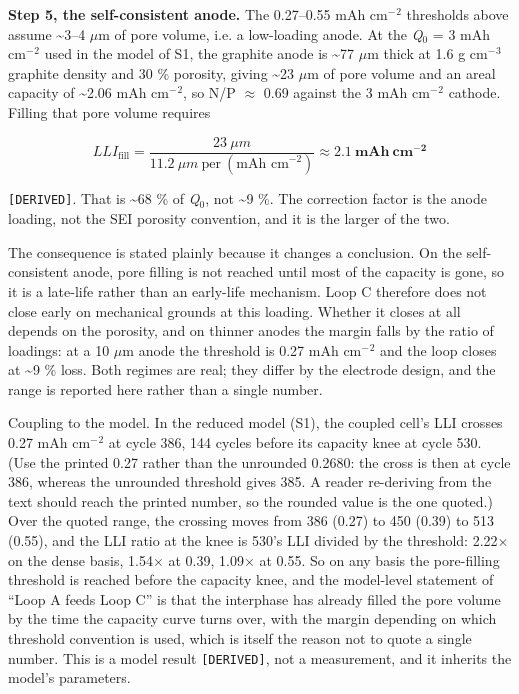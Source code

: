 \documentclass[11pt,a4paper]{article}
\begin{document}
\textbf{Step 5, the self-consistent anode.} The 0.27--0.55 mAh cm\ensuremath{^{-}}\ensuremath{^{2}} thresholds above assume \textasciitilde{}3--4 \ensuremath{\mu}m of pore volume, i.e. a low-loading anode. At the \emph{Q}\ensuremath{_{0}} = 3 mAh cm\ensuremath{^{-}}\ensuremath{^{2}} used in the model of S1, the graphite anode is \textasciitilde{}77 \ensuremath{\mu}m thick at 1.6 g cm\ensuremath{^{-}}\ensuremath{^{3}} graphite density and 30 \% porosity, giving \textasciitilde{}23 \ensuremath{\mu}m of pore volume and an areal capacity of \textasciitilde{}2.06 mAh cm\ensuremath{^{-}}\ensuremath{^{2}}, so N/P \ensuremath{\approx} 0.69 against the 3 mAh cm\ensuremath{^{-}}\ensuremath{^{2}} cathode. Filling that pore volume requires


\begin{equation}LLI_{\text{fill}} = \frac{23\ \mu m}{11.2\ \mu m\ \text{per}\ (\text{mAh cm}^{-2})} \approx \mathbf{2.1\ mAh\ cm^{-2}} \tag{S2.11}\end{equation}


\texttt{[DERIVED]}. That is \textasciitilde{}68 \% of \emph{Q}\ensuremath{_{0}}, not \textasciitilde{}9 \%. The correction factor is the anode loading, not the SEI porosity convention, and it is the larger of the two.


The consequence is stated plainly because it changes a conclusion. On the self-consistent anode, pore filling is not reached until most of the capacity is gone, so it is a late-life rather than an early-life mechanism. Loop C therefore does not close early on mechanical grounds at this loading. Whether it closes at all depends on the porosity, and on thinner anodes the margin falls by the ratio of loadings: at a 10 \ensuremath{\mu}m anode the threshold is 0.27 mAh cm\ensuremath{^{-}}\ensuremath{^{2}} and the loop closes at \textasciitilde{}9 \% loss. Both regimes are real; they differ by the electrode design, and the range is reported here rather than a single number.


Coupling to the model. In the reduced model (S1), the coupled cell's LLI crosses 0.27 mAh cm\ensuremath{^{-}}\ensuremath{^{2}} at cycle 386, 144 cycles before its capacity knee at cycle 530. (Use the printed 0.27 rather than the unrounded 0.2680: the cross is then at cycle 386, whereas the unrounded threshold gives 385. A reader re-deriving from the text should reach the printed number, so the rounded value is the one quoted.) Over the quoted range, the crossing moves from 386 (0.27) to 450 (0.39) to 513 (0.55), and the LLI ratio at the knee is 530's LLI divided by the threshold: 2.22\ensuremath{\times} on the dense basis, 1.54\ensuremath{\times} at 0.39, 1.09\ensuremath{\times} at 0.55. So on any basis the pore-filling threshold is reached before the capacity knee, and the model-level statement of \textquotedblleft{}Loop A feeds Loop C\textquotedblright{} is that the interphase has already filled the pore volume by the time the capacity curve turns over, with the margin depending on which threshold convention is used, which is itself the reason not to quote a single number. This is a model result \texttt{[DERIVED]}, not a measurement, and it inherits the model's parameters.
\end{document}
